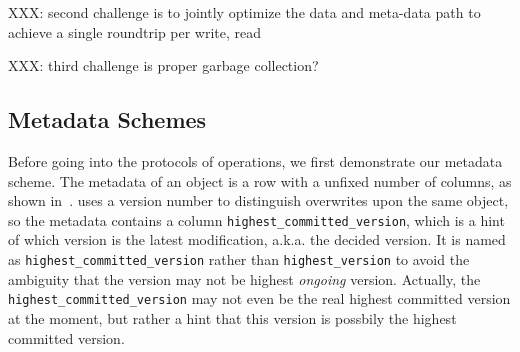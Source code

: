 {XXX: second challenge is to jointly optimize the data and meta-data path to achieve a single 
roundtrip per write, read}

{XXX: third challenge is proper garbage collection?}



%



\subsection{Metadata Schemes}
Before going into the protocols of {\name} operations, we first demonstrate our metadata
scheme. The metadata of an object is a row with a unfixed number of columns, as shown
in~. {\name} uses a version number to distinguish overwrites upon the same
object, so the metadata contains a column \texttt{highest\_committed\_version}, which is
a hint of which version is the latest modification, a.k.a. the decided version. It is named
as \texttt{highest\_committed\_version} rather than \texttt{highest\_version} to avoid the
ambiguity that the version may not be highest \emph{ongoing} version. Actually, the
\texttt{highest\_committed\_version} may not even be the real highest committed version at
the moment, but rather a hint that this version is possbily the highest committed version.

